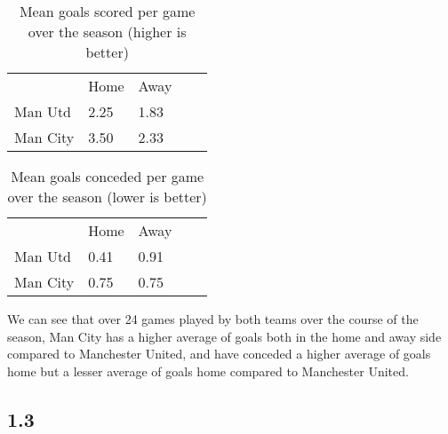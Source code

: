 \documentclass[12pt]{report}
\begin{document}
\begin{table}[ht]
\centering
\caption{Mean goals scored per game over the season (higher is better)}
\begin{tabular}{lllll}
         & Home & Away &  &  \\
Man Utd  & 2.25 & 1.83 &  &  \\
Man City & 3.50 & 2.33 &  &  \\
\end{tabular}
\end{table}

\begin{table}[ht]
\centering
\caption{Mean goals conceded per game over the season (lower is better)}
\begin{tabular}{lllll}
         & Home & Away &  &  \\
Man Utd  & 0.41 & 0.91 &  &  \\
Man City & 0.75 & 0.75 &  &  \\
\end{tabular}
\end{table}

\noindent
We can see that over 24 games played by both teams over the course of the season, Man City has a higher average of goals both in the home and away side compared to Manchester United, and have conceded a higher average of goals home but a lesser average of goals home compared to Manchester United. 

\newpage

\subsection{1.3}
\vspace{0.3cm}
\end{document}
